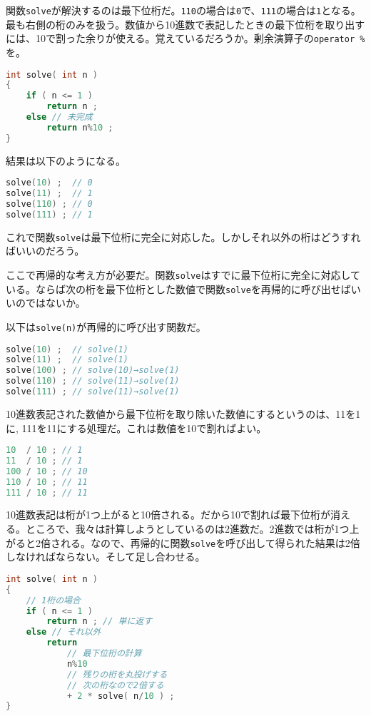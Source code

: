関数\texttt{solve}が解決するのは最下位桁だ。\texttt{110}の場合は\texttt{0}で、\texttt{111}の場合は\texttt{1}となる。最も右側の桁のみを扱う。数値から10進数で表記したときの最下位桁を取り出すには、10で割った余りが使える。覚えているだろうか。剰余演算子の\texttt{operator \%}を。

\begin{lstlisting}[language={C++}]
int solve( int n )
{
    if ( n <= 1 )
        return n ;
    else // 未完成
        return n%10 ;
}
\end{lstlisting}

結果は以下のようになる。

\begin{lstlisting}[language={C++}]
solve(10) ;  // 0
solve(11) ;  // 1
solve(110) ; // 0
solve(111) ; // 1
\end{lstlisting}

これで関数\texttt{solve}は最下位桁に完全に対応した。しかしそれ以外の桁はどうすればいいのだろう。

ここで再帰的な考え方が必要だ。関数\texttt{solve}はすでに最下位桁に完全に対応している。ならば次の桁を最下位桁とした数値で関数\texttt{solve}を再帰的に呼び出せばいいのではないか。

以下は\texttt{solve(n)}が再帰的に呼び出す関数だ。

\ifTombow\pagebreak\fi
\begin{lstlisting}[language={C++}]
solve(10) ;  // solve(1)
solve(11) ;  // solve(1)
solve(100) ; // solve(10)→solve(1)
solve(110) ; // solve(11)→solve(1)
solve(111) ; // solve(11)→solve(1)
\end{lstlisting}

10進数表記された数値から最下位桁を取り除いた数値にするというのは、11を1に, 111を11にする処理だ。これは数値を10で割ればよい。

\begin{lstlisting}[language={C++}]
10  / 10 ; // 1
11  / 10 ; // 1
100 / 10 ; // 10
110 / 10 ; // 11
111 / 10 ; // 11
\end{lstlisting}

10進数表記は桁が1つ上がると10倍される。だから10で割れば最下位桁が消える。ところで、我々は計算しようとしているのは2進数だ。2進数では桁が1つ上がると2倍される。なので、再帰的に関数\texttt{solve}を呼び出して得られた結果は2倍しなければならない。そして足し合わせる。

\begin{lstlisting}[language={C++}]
int solve( int n )
{
    // 1桁の場合
    if ( n <= 1 )
        return n ; // 単に返す
    else // それ以外
        return
            // 最下位桁の計算
            n%10
            // 残りの桁を丸投げする
            // 次の桁なので2倍する
            + 2 * solve( n/10 ) ;
}
\end{lstlisting}

